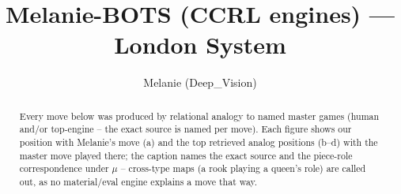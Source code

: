\documentclass[11pt]{article}
\title{Melanie-BOTS (CCRL engines) — London System}
\author{Melanie (Deep\_Vision)}
\date{}
\begin{document}
\maketitle

\begin{abstract}Every move below was produced by relational analogy to named master games (human and/or top-engine -- the exact source is named per move). Each figure shows our position with Melanie's move (a) and the top retrieved analog positions (b--d) with the master move played there; the caption names the exact source and the piece-role correspondence under $\mu$ -- cross-type maps (a rook playing a queen's role) are called out, as no material/eval engine explains a move that way.\end{abstract}

\begin{figure}[p]\centering
\begin{subfigure}{0.46\textwidth}\centering
\resizebox{\linewidth}{!}{%
\newchessgame
\chessboard[
  setfen={rnbq1rk1/pp3ppp/3bpn2/2pp4/3P4/3BPNB1/PPP2PPP/RN1Q1RK1 b - - 1 7},
  showmover=false,
  pgfstyle=straightmove, color=movearrow, markmove={b7-b6}
]}
\caption{}
\end{subfigure}\hfill
\begin{subfigure}{0.46\textwidth}\centering
\resizebox{\linewidth}{!}{%
\newchessgame
\chessboard[
  setfen={rn1qk2r/pbp2ppp/1p1bpn2/3p4/2PP4/3BPN2/PP3PPP/RNBQ1RK1 w kq - 2 7},
  showmover=false,
  pgfstyle=straightmove, color=movearrow, markmove={b2-b3}
]}
\caption{}
\end{subfigure}
\\[4pt]
\begin{subfigure}{0.46\textwidth}\centering
\resizebox{\linewidth}{!}{%
\newchessgame
\chessboard[
  setfen={rn1qk2r/pbp2ppp/1p1bpn2/3p4/2PP4/3BPN2/PP3PPP/RNBQ1RK1 w kq - 2 7},
  showmover=false,
  pgfstyle=straightmove, color=movearrow, markmove={b2-b3}
]}
\caption{}
\end{subfigure}\hfill
\begin{subfigure}{0.46\textwidth}\centering
\resizebox{\linewidth}{!}{%
\newchessgame
\chessboard[
  setfen={rn1qk2r/pbp2ppp/1p1bpn2/3p4/2PP4/3BPN2/PP3PPP/RNBQ1RK1 w kq - 2 7},
  showmover=false,
  pgfstyle=straightmove, color=movearrow, markmove={b2-b3}
]}
\caption{}
\end{subfigure}

\end{figure}
\end{document}
